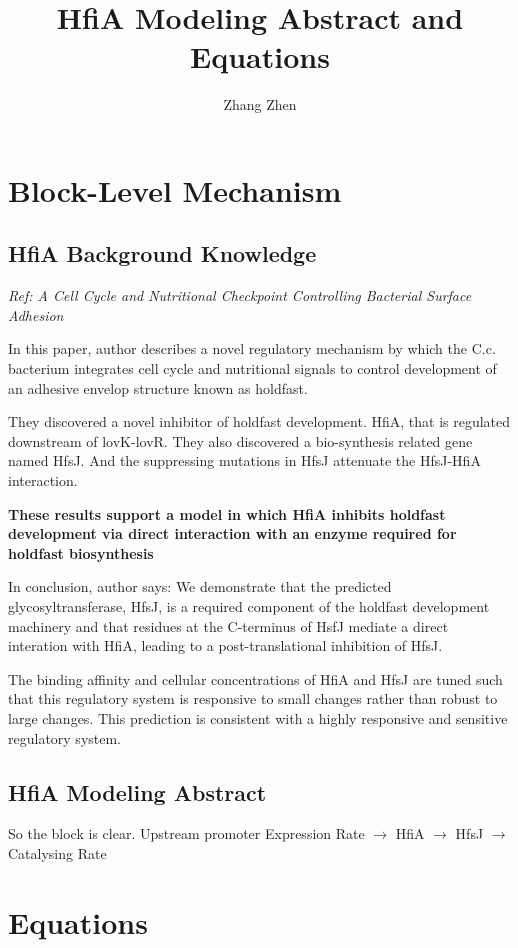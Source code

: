 \documentclass[UTF8]{ctexart}
\title{HfiA Modeling Abstract and Equations}
\author{Zhang Zhen}
\begin{document}
    \maketitle
    \section{Block-Level Mechanism}
        \subsection{HfiA Background Knowledge}
            \textit{Ref: A Cell Cycle and Nutritional Checkpoint Controlling Bacterial Surface Adhesion}

            In this paper, author describes a novel regulatory mechanism by which the C.c. bacterium integrates cell cycle and nutritional signals to control development of an adhesive envelop structure known as holdfast.

            They discovered a novel inhibitor of holdfast development. HfiA, that is regulated downstream of lovK-lovR. They also discovered a bio-synthesis related gene named HfsJ. And the suppressing mutations in HfsJ attenuate the HfsJ-HfiA interaction.

            \textbf{These results support a model in which HfiA inhibits holdfast development via direct interaction with an enzyme required for holdfast biosynthesis}

            In conclusion, author says: We demonstrate that the predicted glycosyltransferase, HfsJ, is a required component of the holdfast development machinery and that residues at the C-terminus of HsfJ mediate a direct interation with HfiA, leading to a post-translational inhibition of HfsJ.

            The binding affinity and cellular concentrations of HfiA and HfsJ are tuned such that this regulatory system is responsive to small changes rather than robust to large changes. This prediction is consistent with a highly responsive and sensitive regulatory system.

        \subsection{HfiA Modeling Abstract}
        So the block is clear. Upstream promoter Expression Rate $\rightarrow$ HfiA $\rightarrow$ HfsJ $\rightarrow$ Catalysing Rate

    \section{Equations}
\end{document}
